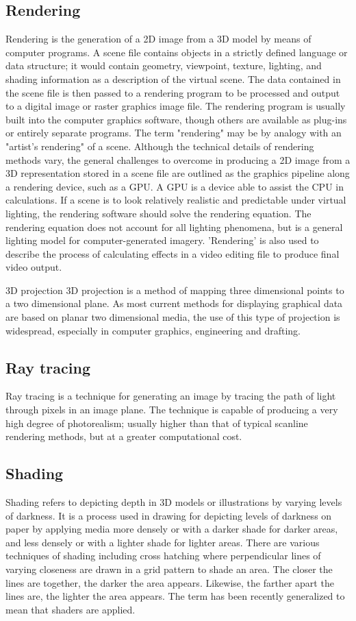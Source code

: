 \documentclass[a4paper]{article}
\begin{document}
\subsection{Rendering}
Rendering is the generation of a 2D image from a 3D model by means of computer programs. A scene file contains objects in a strictly defined language or data structure; it would contain geometry, viewpoint, texture, lighting, and shading information as a description of the virtual scene. The data contained in the scene file is then passed to a rendering program to be processed and output to a digital image or raster graphics image file. The rendering program is usually built into the computer graphics software, though others are available as plug-ins or entirely separate programs. The term "rendering" may be by analogy with an "artist's rendering" of a scene. Although the technical details of rendering methods vary, the general challenges to overcome in producing a 2D image from a 3D representation stored in a scene file are outlined as the graphics pipeline along a rendering device, such as a GPU. A GPU is a device able to assist the CPU in calculations. If a scene is to look relatively realistic and predictable under virtual lighting, the rendering software should solve the rendering equation. The rendering equation does not account for all lighting phenomena, but is a general lighting model for computer-generated imagery. 'Rendering' is also used to describe the process of calculating effects in a video editing file to produce final video output.

3D projection
3D projection is a method of mapping three dimensional points to a two dimensional plane. As most current methods for displaying graphical data are based on planar two dimensional media, the use of this type of projection is widespread, especially in computer graphics, engineering and drafting.
  \newpage
  \subsection{Ray tracing}
  Ray tracing is a technique for generating an image by tracing the path of light through pixels in an image plane. The technique is capable of producing a very high degree of photorealism; usually higher than that of typical scanline rendering methods, but at a greater computational cost.
 
 \subsection{Shading}
 Shading refers to depicting depth in 3D models or illustrations by varying levels of darkness. It is a process used in drawing for depicting levels of darkness on paper by applying media more densely or with a darker shade for darker areas, and less densely or with a lighter shade for lighter areas. There are various techniques of shading including cross hatching where perpendicular lines of varying closeness are drawn in a grid pattern to shade an area. The closer the lines are together, the darker the area appears. Likewise, the farther apart the lines are, the lighter the area appears. The term has been recently generalized to mean that shaders are applied.
 
\end{document}
